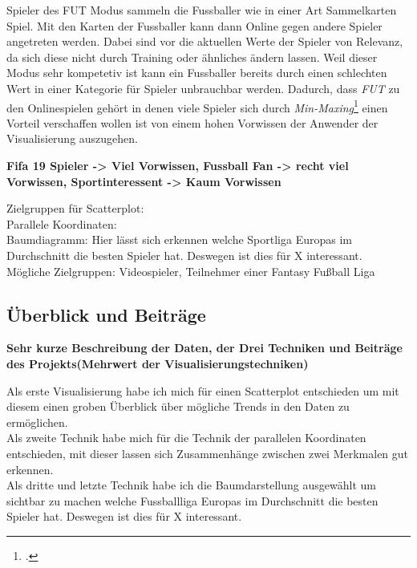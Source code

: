 \documentclass[usegeometry=true]{scrartcl}
\begin{document}
Spieler des FUT Modus sammeln die Fussballer wie in einer Art Sammelkarten Spiel. Mit den Karten der Fussballer kann dann Online gegen andere Spieler angetreten werden. Dabei sind vor die aktuellen Werte der Spieler von Relevanz, da sich diese nicht durch Training oder ähnliches ändern lassen. Weil dieser Modus sehr kompetetiv ist kann ein Fussballer bereits durch einen schlechten Wert in einer Kategorie für Spieler unbrauchbar werden. Dadurch, dass \textit{FUT} zu den Onlinespielen gehört in denen viele Spieler sich durch \textit{Min-Maxing}\footcite{noauthor_min-maxing_2014} einen Vorteil verschaffen wollen ist von einem hohen Vorwissen der Anwender der Visualisierung auszugehen.  




\textbf{Fifa 19 Spieler -> Viel Vorwissen, Fussball Fan -> recht viel Vorwissen, Sportinteressent -> Kaum Vorwissen}

Zielgruppen für Scatterplot:\\
Parallele Koordinaten:\\
Baumdiagramm: Hier lässt sich erkennen welche Sportliga Europas im Durchschnitt die besten Spieler hat. Deswegen ist dies für X interessant.\\
Mögliche Zielgruppen: Videospieler, Teilnehmer einer Fantasy Fußball Liga
\subsection{Überblick und Beiträge}

\textbf{Sehr kurze Beschreibung der Daten, der Drei Techniken und Beiträge des Projekts(Mehrwert der Visualisierungstechniken)} 

Als erste Visualisierung habe ich mich für einen Scatterplot entschieden um mit diesem einen groben Überblick über mögliche Trends in den Daten zu ermöglichen.\\

Als zweite Technik habe mich für die Technik der parallelen Koordinaten entschieden, mit dieser lassen sich Zusammenhänge zwischen zwei Merkmalen gut erkennen.\\

Als dritte und letzte Technik habe ich die Baumdarstellung ausgewählt um sichtbar zu machen welche Fussballliga Europas im Durchschnitt die besten Spieler hat. Deswegen ist dies für X interessant.
\newpage
\end{document}

